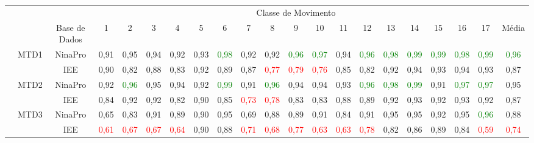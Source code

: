 \begin{sidewaystable}[htb]
	\captionsetup{justification=centering}
	{
		\begin{tabular}{cc|c|ccccccccccccccccc|c}
			\toprule
			&&&	\multicolumn{17}{c}{Classe de Movimento} &\\
			&& Base de Dados & 1&2&3&4&5&6&7&8&9&10&11&12&13&14&15&16&17&Média\\
			\midrule \midrule
			\multirow{8}{*}{\rotatebox{90}{Método}}
			& \multirow{2}{*}{MTD1}	& NinaPro	&0,91&	0,95&	0,94&	0,92&	0,93&		\textcolor{green}{0,98}&	0,92&	0,92&		\textcolor{green}{0,96}&		\textcolor{green}{0,97}&	0,94&		\textcolor{green}{0,96}&		\textcolor{green}{0,98}&		\textcolor{green}{0,99}&		\textcolor{green}{0,99}&		\textcolor{green}{0,98}&		\textcolor{green}{0,99}&		\textcolor{green}{0,96}\\
			&						& IEE		&0,90	&0,82	&0,88	&0,83	&0,92	&0,89	&0,87	&	\textcolor{red}{0,77}	&	\textcolor{red}{0,79}	&	\textcolor{red}{0,76}	&0,85	&0,82	&0,92	&0,94	&0,93	&0,94	&0,93	&0,87\\
			\cline{2-21}                                                                                                                                                             
			& \multirow{2}{*}{MTD2}	& NinaPro	&0,92&		\textcolor{green}{0,96}&	0,95&	0,94&	0,92&		\textcolor{green}{0,99}&	0,91&		\textcolor{green}{0,96}&	0,94&	0,94&	0,93&		\textcolor{green}{0,96}&		\textcolor{green}{0,98}&		\textcolor{green}{0,99}&	0,91&		\textcolor{green}{0,97}&		\textcolor{green}{0,97}&	0,95\\
			&						& IEE		&0,84	&0,92	&0,92	&0,82	&0,90	&0,85	&	\textcolor{red}{0,73}	&	\textcolor{red}{0,78}	&0,83	&0,83	&0,88	&0,89	&0,92	&0,93	&0,92	&0,93	&0,92	&0,87\\
			\cline{2-21}                                                                                                                                                             
			& \multirow{2}{*}{MTD3}	& NinaPro	&0,65&	0,83&	0,91&	0,89&	0,90&	0,95&	0,69&	0,88&	0,89&	0,91&	0,84&	0,91&	0,95&	0,95&	0,92&	0,95&		\textcolor{green}{0,96}&	0,88\\
			&						& IEE		&\textcolor{red}{0,61}	&\textcolor{red}{0,67}	&\textcolor{red}{0,67}	&\textcolor{red}{0,64}	&0,90	&0,88	&	\textcolor{red}{0,71}	&\textcolor{red}{0,68}	&	\textcolor{red}{0,77}	&\textcolor{red}{0,63}	&\textcolor{red}{0,63}	&	\textcolor{red}{0,78}	&0,82	&0,86	&0,89	&0,84	&\textcolor{red}{0,59}	&	\textcolor{red}{0,74}\\

\end{tabular}}
\end{sidewaystable}
